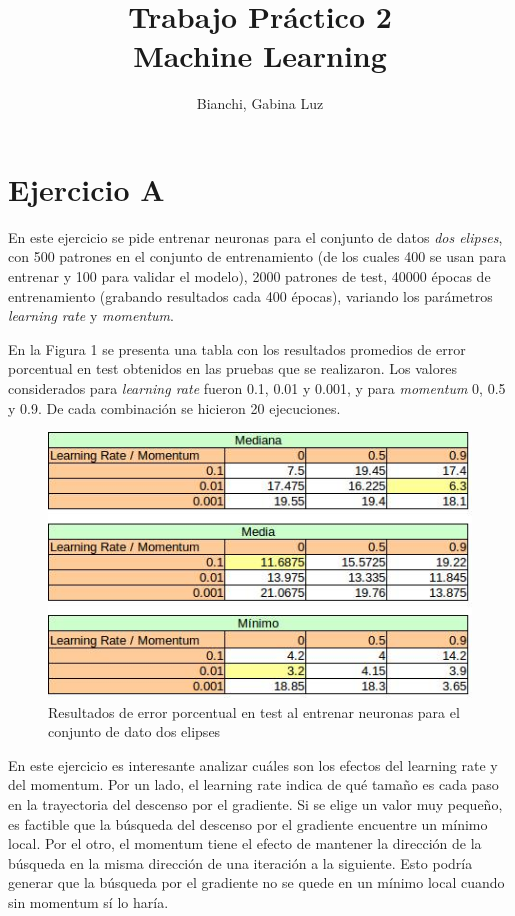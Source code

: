 \documentclass[12pt, a4paper]{article}
\begin{document}
 
\title{Trabajo Práctico 2\\ Machine Learning} 
\author{Bianchi, Gabina Luz} 
\maketitle
\section*{Ejercicio A}

En este ejercicio se pide entrenar neuronas para el conjunto de datos \textit{dos elipses}, con 500 patrones en el conjunto de entrenamiento (de los cuales 400 se usan para entrenar y 100 para validar el modelo), 2000 patrones de test, 40000 épocas de entrenamiento (grabando resultados cada 400 épocas), variando los parámetros \textit{learning rate} y \textit{momentum}.

\bigskip

En la Figura 1 se presenta una tabla con los resultados promedios de error porcentual en test obtenidos en las pruebas que se realizaron. Los valores considerados para \textit{learning rate} fueron 0.1, 0.01 y 0.001, y para \textit{momentum} 0, 0.5 y 0.9. De cada combinación se hicieron 20 ejecuciones. 

\begin{figure}
    \centering
	\includegraphics[scale=0.70]{tablaA}
	\caption{Resultados de error porcentual en test al entrenar neuronas para el conjunto de dato dos elipses}
\end{figure}

En este ejercicio es interesante analizar cuáles son los efectos del learning rate y del momentum. Por un lado, el learning rate indica de qué tamaño es cada paso en la trayectoria del descenso por el gradiente. Si se elige un valor muy pequeño, es factible que la búsqueda del descenso por el gradiente encuentre un mínimo local. Por el otro, el momentum tiene el efecto de mantener la dirección de la búsqueda en la misma dirección de una iteración a la siguiente. Esto podría generar que la búsqueda por el gradiente no se quede en un mínimo local cuando sin momentum sí lo haría. 
\end{document}
